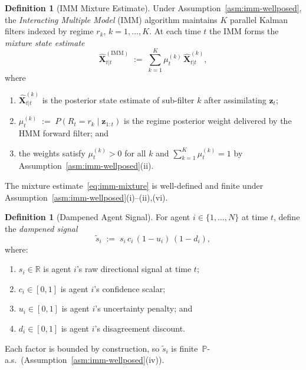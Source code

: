 \documentclass[12pt,openany]{book}
\numberwithin{equation}{chapter}
\theoremstyle{plain}
\theoremstyle{definition}
\newtheorem{definition}[theorem]{Definition}
\theoremstyle{remark}
\begin{document}
\begin{definition}[IMM Mixture Estimate]
\label{def:imm-mixture}
Under Assumption~\ref{asm:imm-wellposed}, the
\emph{Interacting Multiple Model} (IMM) algorithm maintains
$K$ parallel Kalman filters indexed by regime
$r_k$, $k = 1,\ldots,K$.  At each time $t$ the IMM forms
the \emph{mixture state estimate}
\begin{equation}
  \hat{\mathbf{X}}_{t|t}^{(\mathrm{IMM})}
  \;:=\;
  \sum_{k=1}^{K} \mu_t^{(k)}\,\hat{\mathbf{X}}_{t|t}^{(k)},
  \label{eq:imm-mixture}
\end{equation}
where
\begin{enumerate}
  \item $\hat{\mathbf{X}}_{t|t}^{(k)}$ is the posterior state
        estimate of sub-filter $k$ after assimilating
        $\mathbf{z}_t$;
  \item $\mu_t^{(k)} \;:=\; P\!\left(R_t = r_k \;\big|\;
        \mathbf{z}_{1:t}\right)$ is the regime posterior weight
        delivered by the HMM forward filter; and
  \item the weights satisfy
        $\mu_t^{(k)} > 0$ for all $k$ and
        $\sum_{k=1}^{K}\mu_t^{(k)} = 1$ by
        Assumption~\ref{asm:imm-wellposed}(ii).
\end{enumerate}
The mixture estimate~\eqref{eq:imm-mixture} is well-defined and
finite under Assumption~\ref{asm:imm-wellposed}(i)--(ii),(vi).
\end{definition}

\begin{definition}[Dampened Agent Signal]
\label{def:dampened-signal}
For agent $i \in \{1,\ldots,N\}$ at time $t$, define the
\emph{dampened signal}
\begin{equation}
  \tilde{s}_i \;:=\;
  s_i\,c_i\,(1 - u_i)\,(1 - d_i),
  \label{eq:dampened-signal}
\end{equation}
where:
\begin{enumerate}
  \item $s_i \in \mathbb{R}$ is agent $i$'s raw directional
        signal at time $t$;
  \item $c_i \in [0,1]$ is agent $i$'s confidence scalar;
  \item $u_i \in [0,1]$ is agent $i$'s uncertainty penalty; and
  \item $d_i \in [0,1]$ is agent $i$'s disagreement discount.
\end{enumerate}
Each factor is bounded by construction, so $\tilde{s}_i$ is
finite~$\mathbb{P}$-a.s.\ (Assumption~\ref{asm:imm-wellposed}(iv)).
\end{definition}
\end{document}
